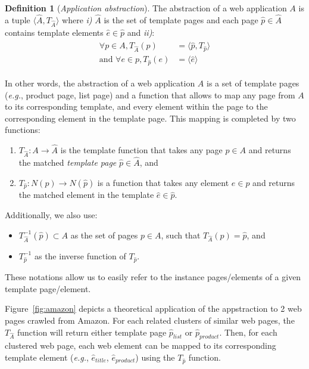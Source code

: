 \documentclass[sigconf,authordraft]{acmart}
\theoremstyle{definition}
\newtheorem{defn}{Definition}[section]
\begin{document}
\begin{defn}[\em Application abstraction]
The abstraction of a web application $A$ is a tuple $\langle\hat{A}, T_{\hat{A}}\rangle$ where \emph{i)} $\hat{A}$ is the set of template pages and each page $\hat{p} \in \hat{A}$ contains template elements $\hat{e} \in \hat{p}$ and \emph{ii)}:
\begin{align}
  \label{eq:1}
  \begin{split}
    \forall p \in A, T_{\hat{A}}(p) & = \langle\hat{p}, T_{\hat{p}}\rangle \\
    \text{and } \forall e \in p, T_{\hat{p}}(e) & = \langle\hat{e}\rangle
  \end{split}
\end{align}\end{defn}

In other words, the abstraction of a web application $A$ is a set of template pages (\emph{e.g.}, product page, list page) and a function that allows to map any page from $A$ to its corresponding template, and every element within the page to the corresponding element in the template page.
This mapping is completed by two functions:
\begin{enumerate}
\item $T_{\hat{A}}: A \to \hat{A}$ is the template function that takes any page $p \in A$ and returns the matched \emph{template page} $\hat{p} \in \hat{A}$, and
\item $T_{\hat{p}}: N(p) \to N(\hat{p})$ is a function that takes any element $e \in p$ and returns the matched element in the template $\hat{e} \in \hat{p}$.
\end{enumerate}

Additionally, we also use:
\begin{itemize}
  \item $T^{-1}_{\hat{A}}(\hat{p}) \subset A$ as the set of pages $p \in A$, such that $T_{\hat{A}}(p) = \hat{p}$, and 
  \item $T^{-1}_{\hat{p}}$ as the inverse function of $T_{\hat{p}}$.
\end{itemize}
These notations allow us to easily refer to the instance pages/elements of a given template page/element.

Figure~\ref{fig:amazon} depicts a theoretical application of the appstraction to 2 web pages crawled from Amazon.
For each related clusters of similar web pages, the $T_{\hat{A}}$ function will return either template page $\hat{p}_{list}$ or $\hat{p}_{product}$.
Then, for each clustered web page, each web element can be mapped to its corresponding template element (\emph{e.g.}, $\hat{e}_{title}$, $\hat{e}_{product}$) using the $T_{\hat{p}}$ function.
\end{document}
